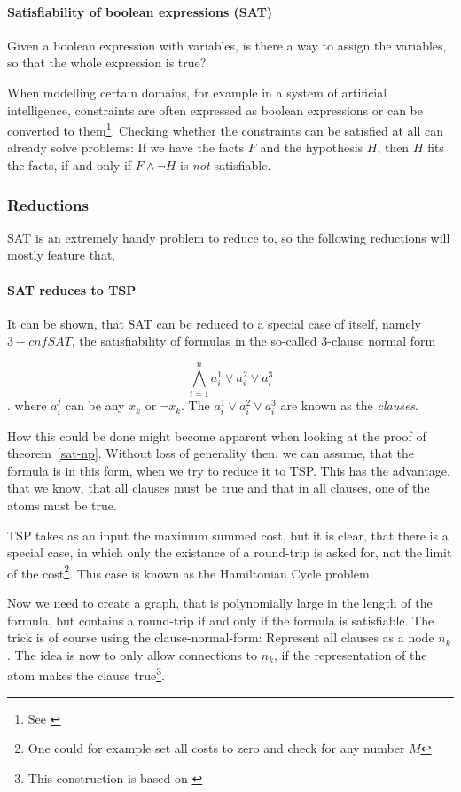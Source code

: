 \paragraph{Satisfiability of boolean expressions (SAT)}
Given a boolean expression with variables, is there a way to assign the 
variables, so that the whole expression is true?
\begin{example}[Relevance]
	When modelling certain domains, for example in a system of artificial
	intelligence, constraints are often expressed as boolean expressions or can
	be converted to them\footnote{See \cite{russell1995artificial}}. Checking
	whether the constraints can be satisfied at all can already solve problems:
	If we have the facts $F$ and the hypothesis $H$, then $H$ fits the facts, if
	and only if $F\wedge\lnot H$ is \emph{not} satisfiable.
\end{example}
\subsubsection{Reductions}
SAT is an extremely handy problem to reduce to, so the following reductions 
will mostly feature that.
\paragraph{SAT reduces to TSP}
It can be shown, that SAT can be reduced to a special case of itself, namely 
$3-cnf SAT$, the satisfiability of formulas in the so-called 3-clause normal form

\[ \bigwedge_{i=1}^n a^1_i\vee a^2_i \vee a^3_i \].
where $a^j_i$ can be any $x_k$ or $\lnot x_k$. The 
$a^1_i\vee a^2_i \vee a^3_i$ are known as the \emph{clauses}.

How this could be done might become apparent when looking at the proof of
theorem~\ref{sat-np}. Without loss of generality then, we can assume, that 
the formula is in this form, when we try to reduce it to TSP. This has the 
advantage, that we know, that all clauses must be true and that in all 
clauses, one of the atoms must be true.

TSP takes as an input the maximum summed cost, but it is clear, that there is 
a special case, in which only the existance of a round-trip is asked for, not 
the limit of the cost\footnote{One could for example set all costs to zero 
and check for any number $M$}. This case is known as the Hamiltonian Cycle problem.

Now we need to create a graph, that is polynomially large in the length of 
the formula, but contains a round-trip if and only if the formula is 
satisfiable. The trick is of course using the clause-normal-form: Represent 
all clauses as a node $n_k$. The idea is now to only allow connections to 
$n_k$, if the representation of the atom makes the clause true\footnote{This 
construction is based on \cite[p. 286-291]{sipser2006introduction}}.


